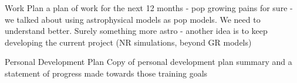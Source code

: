 \documentclass[a4paper, 12pt, twoside, openright, titlepage]{book}
\begin{document}
\begin{chapter}{Work Plan}
a plan of work for the next 12 months
- pop growing pains for sure
- we talked about using astrophysical models as pop models. We need to understand better. Surely something more astro
- another idea is to keep developing the current project (NR simulations, beyond GR models)
\end{chapter}

\begin{chapter}{Personal Development Plan}
Copy of personal development plan summary and a statement of progress made towards those training goals
\end{chapter}

\appendix
%
%
%

\backmatter

\end{document}
